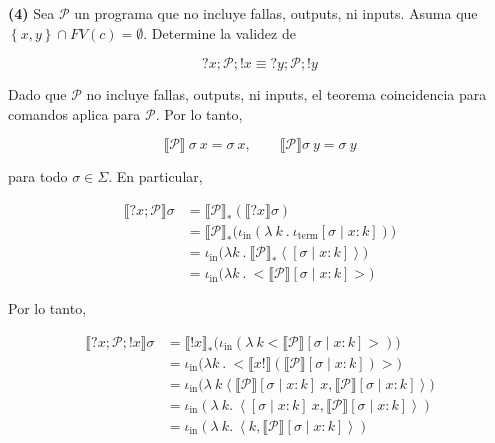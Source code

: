\documentclass[a4paper, 12pt]{article}
\begin{document}
\pagebreak 

\begin{myframe}
  \textbf{(4)} Sea $\mathcal{P}$ un programa que no incluye fallas, outputs, ni
  inputs. Asuma que $\left\{ x, y \right\} \cap FV(c) = \emptyset$. Determine la
  validez de 

  \begin{equation*}
    ?x; \mathcal{P}; !x \equiv ?y ; \mathcal{P}; !y
  \end{equation*}
\end{myframe}

Dado que $\mathcal{P}$ no incluye fallas, outputs, ni inputs, el teorema
coincidencia para comandos aplica para $\mathcal{P}$. Por lo tanto, 

\begin{equation*}
  \llbracket \mathcal{P} \rrbracket ~ \sigma ~ x = \sigma ~x, \qquad
  \llbracket \mathcal{P} \rrbracket\sigma ~ y = \sigma ~ y
\end{equation*}

para todo $\sigma \in \Sigma$. En particular, 

\begin{align*}
  \llbracket ?x ; \mathcal{P} \rrbracket\sigma 
  &= \llbracket \mathcal{P} \rrbracket_* \left( \llbracket ?x \rrbracket \sigma
  \right)  \\ 
  &=\llbracket \mathcal{P} \rrbracket_* \Big( \iota_{\text{in}} \left(\lambda ~
      k ~.~ \iota_{\text{term}}[\sigma \mid x :
  k] \right) \Big) \\ 
  &=\iota_{\text{in}} \Big( \lambda k ~. ~ \llbracket \mathcal{P} \rrbracket_*
  \left< [\sigma \mid x : k] \right> \Big) \\ 
  &=\iota_{\text{in}} \Big( \lambda k ~ . ~ \Big< \llbracket \mathcal{P} \rrbracket[\sigma \mid x : k]\Big> \Big)
\end{align*}

Por lo tanto, 

\begin{align*}
  \llbracket ?x ; \mathcal{P}; !x \rrbracket\sigma 
  &= \llbracket !x \rrbracket_* \Big( \iota_{\text{in}}\left( \lambda ~ k \Big<
  \llbracket \mathcal{P} \rrbracket[\sigma \mid x : k]\Big> \right)  \Big)  \\ 
  &=\iota_{\text{in}} \Big( \lambda k ~. ~ \Big< \llbracket x! \rrbracket\left(
  \llbracket \mathcal{P} \rrbracket[\sigma \mid x : k]\right)  \Big> \Big) \\ 
  &= \iota_{\text{in}} \Big( \lambda ~ k \left< \llbracket \mathcal{P} \rrbracket[\sigma
  \mid x  : k ] ~ x, \llbracket \mathcal{P} \rrbracket[\sigma\mid x : k] \right>
\Big) \\ 
  &=\iota_{\text{in}} \left( \lambda ~ k .~\left< [\sigma \mid x : k] ~ x,
  \llbracket \mathcal{P} \rrbracket[\sigma \mid x : k] \right> \right) \\
  &=\iota_{\text{in}} \left( \lambda ~ k .~\left< k,
  \llbracket \mathcal{P} \rrbracket[\sigma \mid x : k] \right> \right) 
\end{align*} 
\end{document}
